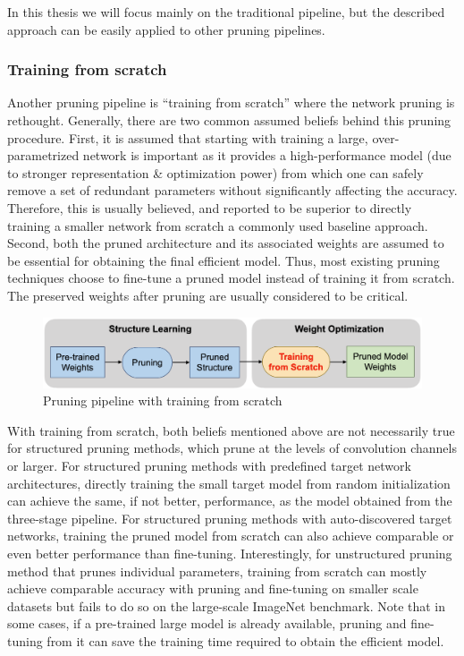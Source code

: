 In this thesis we will focus mainly on the traditional pipeline, but the
described approach can be easily applied to other pruning pipelines.

\subsubsection{Training from scratch}
Another pruning pipeline is ``training from scratch'' where the network pruning
is rethought.
Generally, there are two common assumed beliefs behind this pruning procedure.
First, it is assumed that starting with training a large, over-parametrized
network is important as it provides a high-performance model (due to stronger
representation \& optimization power) from which one can safely remove a set of
redundant parameters without significantly affecting the accuracy. Therefore,
this is usually believed, and reported to be superior to directly training a
smaller network from scratch \- a commonly used baseline approach.
Second, both the pruned architecture and its associated weights are assumed to
be essential for obtaining the final efficient model. Thus, most existing
pruning techniques choose to fine-tune a pruned model instead of training it
from scratch. The preserved weights after pruning are usually considered to be
critical.

\begin{figure}[ht]
    \includegraphics[width=\textwidth]{images/pruning/liu_pipeline.png}
    \centering
    \caption{Pruning pipeline with training from scratch}\label{fig:liu_pipeline}
\end{figure}

With training from scratch, both beliefs mentioned above are not necessarily
true for structured pruning methods, which prune at the levels of convolution
channels or larger.
For structured pruning methods with predefined target network architectures,
directly training the small target model from random initialization can achieve
the same, if not better, performance, as the model obtained from the
three-stage pipeline.
For structured pruning methods with auto-discovered target networks, training
the pruned model from scratch can also achieve comparable or even better
performance than fine-tuning.
Interestingly, for unstructured pruning method that prunes individual
parameters, training from scratch can mostly achieve comparable accuracy with
pruning and fine-tuning on smaller scale datasets but fails to do so on the
large-scale ImageNet benchmark.
Note that in some cases, if a pre-trained large model is already available,
pruning and fine-tuning from it can save the training time required to obtain
the efficient model.~\cite{liu2018rethinking}


